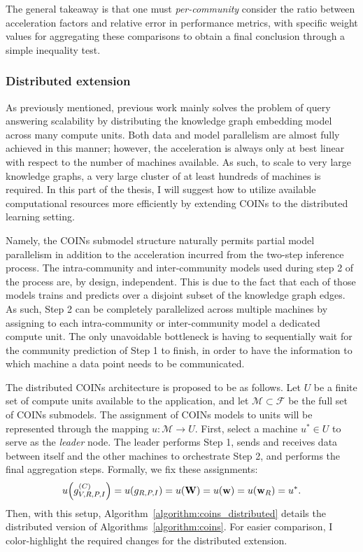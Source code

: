 The general takeaway is that one must \emph{per-community} consider the ratio between acceleration factors and relative error in performance metrics, with specific weight values for aggregating these comparisons to obtain a final conclusion through a simple inequality test.


\subsubsection{Distributed extension}

As previously mentioned, previous work mainly solves the problem of query answering scalability by distributing the knowledge graph embedding model across many compute units. Both data and model parallelism are almost fully achieved in this manner; however, the acceleration is always only at best linear with respect to the number of machines available. As such, to scale to very large knowledge graphs, a very large cluster of at least hundreds of machines is required. In this part of the thesis, I will suggest how to utilize available computational resources more efficiently by extending COINs to the distributed learning setting.

Namely, the COINs submodel structure naturally permits partial model parallelism in addition to the acceleration incurred from the two-step inference process. The intra-community and inter-community models used during step 2 of the process are, by design, independent. This is due to the fact that each of those models trains and predicts over a disjoint subset of the knowledge graph edges. As such, Step 2 can be completely parallelized across multiple machines by assigning to each intra-community or inter-community model a dedicated compute unit. The only unavoidable bottleneck is having to sequentially wait for the community prediction of Step 1 to finish, in order to have the information to which machine a data point needs to be communicated.

The distributed COINs architecture is proposed to be as follows. Let $U$ be a finite set of compute units available to the application, and let $\mathcal{M} \subset \mathcal{F}$ be the full set of COINs submodels. The assignment of COINs models to units will be represented through the mapping $u: \mathcal{M} \to U$. First, select a machine $u^* \in U$ to serve as the \emph{leader} node. The leader performs Step 1, sends and receives data between itself and the other machines to orchestrate Step 2, and performs the final aggregation steps. Formally, we fix these assignments:
\begin{equation}
u\mathopen{}\left(g_{V,R,P,I}^{\mathopen{}\left(C\right)}\right)=u\mathopen{}\left(g_{R,P,I}\right)=u\mathopen{}\left(\mathbf{W}\right)=u\mathopen{}\left(\mathbf{w}\right)=u\mathopen{}\left(\mathbf{w}_R\right)=u^*.
\end{equation}
Then, with this setup, Algorithm~\ref{algorithm:coins_distributed} details the distributed version of Algorithms~\ref{algorithm:coins}. For easier comparison, I color-highlight the required changes for the distributed extension.

